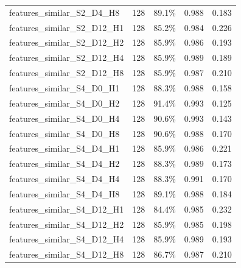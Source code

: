 \documentclass[11pt]{article}
\begin{document}
\begin{longtable}{p{}rrrr}
features\_\allowbreak{}similar\_\allowbreak{}S2\_\allowbreak{}D4\_\allowbreak{}H8 & 128 & 89.1\% & 0.988 & 0.183\\
features\_\allowbreak{}similar\_\allowbreak{}S2\_\allowbreak{}D12\_\allowbreak{}H1 & 128 & 85.2\% & 0.984 & 0.226\\
features\_\allowbreak{}similar\_\allowbreak{}S2\_\allowbreak{}D12\_\allowbreak{}H2 & 128 & 85.9\% & 0.986 & 0.193\\
features\_\allowbreak{}similar\_\allowbreak{}S2\_\allowbreak{}D12\_\allowbreak{}H4 & 128 & 85.9\% & 0.989 & 0.189\\
features\_\allowbreak{}similar\_\allowbreak{}S2\_\allowbreak{}D12\_\allowbreak{}H8 & 128 & 85.9\% & 0.987 & 0.210\\
features\_\allowbreak{}similar\_\allowbreak{}S4\_\allowbreak{}D0\_\allowbreak{}H1 & 128 & 88.3\% & 0.988 & 0.158\\
features\_\allowbreak{}similar\_\allowbreak{}S4\_\allowbreak{}D0\_\allowbreak{}H2 & 128 & 91.4\% & 0.993 & 0.125\\
features\_\allowbreak{}similar\_\allowbreak{}S4\_\allowbreak{}D0\_\allowbreak{}H4 & 128 & 90.6\% & 0.993 & 0.143\\
features\_\allowbreak{}similar\_\allowbreak{}S4\_\allowbreak{}D0\_\allowbreak{}H8 & 128 & 90.6\% & 0.988 & 0.170\\
features\_\allowbreak{}similar\_\allowbreak{}S4\_\allowbreak{}D4\_\allowbreak{}H1 & 128 & 85.9\% & 0.986 & 0.221\\
features\_\allowbreak{}similar\_\allowbreak{}S4\_\allowbreak{}D4\_\allowbreak{}H2 & 128 & 88.3\% & 0.989 & 0.173\\
features\_\allowbreak{}similar\_\allowbreak{}S4\_\allowbreak{}D4\_\allowbreak{}H4 & 128 & 88.3\% & 0.991 & 0.170\\
features\_\allowbreak{}similar\_\allowbreak{}S4\_\allowbreak{}D4\_\allowbreak{}H8 & 128 & 89.1\% & 0.988 & 0.184\\
features\_\allowbreak{}similar\_\allowbreak{}S4\_\allowbreak{}D12\_\allowbreak{}H1 & 128 & 84.4\% & 0.985 & 0.232\\
features\_\allowbreak{}similar\_\allowbreak{}S4\_\allowbreak{}D12\_\allowbreak{}H2 & 128 & 85.9\% & 0.985 & 0.198\\
features\_\allowbreak{}similar\_\allowbreak{}S4\_\allowbreak{}D12\_\allowbreak{}H4 & 128 & 85.9\% & 0.989 & 0.193\\
features\_\allowbreak{}similar\_\allowbreak{}S4\_\allowbreak{}D12\_\allowbreak{}H8 & 128 & 86.7\% & 0.987 & 0.210\\

\end{longtable}
\end{document}
